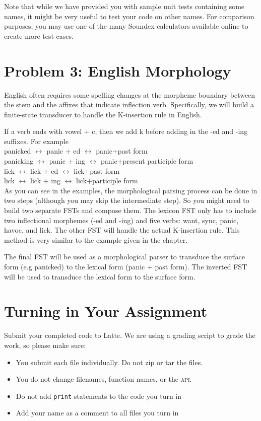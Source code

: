 \documentclass[11pt,letterpaper]{article}
\begin{document}
Note that while we have provided you with sample unit
tests containing some names, it might be very useful to test
your code on other names. For comparison purposes, you may
use one of the many Soundex calculators available online to create more test cases.

\section*{Problem 3: English Morphology}

English often requires some spelling changes at the morpheme boundary between the stem and the affixes that indicate inflection verb.
Specifically, we will build a finite-state transducer to handle the K-insertion rule in English.

If a verb ends with vowel + c, then we add k before adding in the -ed and -ing suffixes. For example \\

\noindent panicked $\leftrightarrow$ panic + ed $\leftrightarrow$ panic+past form\\
panicking $\leftrightarrow$ panic + ing $\leftrightarrow$ panic+present participle form \\
lick $\leftrightarrow$ lick + ed $\leftrightarrow$ lick+past form \\
lick $\leftrightarrow$ lick + ing $\leftrightarrow$ lick+participle form \\

As you can see in the examples, the morphological parsing process can be done in two steps (although you may skip the intermediate step). So you might need to build two separate FSTs and compose them. 
The lexicon FST only has to include two inflectional morphemes (-ed and -ing) and five verbs: want, sync, panic, havoc, and lick. The other FST will handle the actual K-insertion rule. 
This method is very similar to the example given in the chapter.

The final FST will be used as a morphological parser to transduce the surface form (e.g panicked) to the lexical form (panic + past form). 
The inverted FST will be used to transduce the lexical form to the surface form. 




\section*{Turning in Your Assignment}

Submit your completed code to Latte. We are using a grading script to grade the work, so please make sure:
\begin{itemize}
  \item You submit each file individually. Do not zip or tar the files. 
  \item You do not change filenames, function names, or the \textsc{api}.
  \item Do not add \texttt{print} statements to the code you turn in
  \item Add your name as a comment to all files you turn in
\end{itemize}
\end{document}
